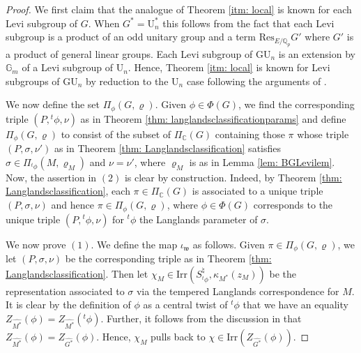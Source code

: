 \documentclass[reqno,11pt]{amsart}
\theoremstyle{remark}
\newcommand{\GU}{\mathrm{GU}}
\newcommand{\U}{\mathrm{U}}
\newcommand{\C}{\mathbb{C}}
\newcommand{\Res}{\mathrm{Res}}
\newcommand{\Irr}{\mathrm{Irr}}
\newcommand{\Gm}{{\mathbb{G}_m}}
\newcommand{\mf}{\mathfrak}
\newcommand{\Q}{\mathbb{Q}}
\begin{document}
\begin{proof}
We first claim that the analogue of Theorem \ref{itm: local} is known for each Levi subgroup of $G$. When $G^*= \U^*_n$ this follows from the fact that each Levi subgroup is a product of an odd unitary group and a term $\Res_{E/\Q_p} G'$ where $G'$ is a product of general linear groups. Each Levi subgroup of $\GU_n$ is an extension by $\Gm$ of a Levi subgroup of $\U_n$. Hence, Theorem \ref{itm: local} is known for Levi subgroups of $\GU_n$ by reduction to the $\U_n$ case following the arguments of \cite[\S2-3]{BMN}.

We now define the set $\Pi_{\phi}(G, \varrho)$. Given $\phi \in \Phi(G)$, we find the corresponding triple $(P, {}^t\phi, \nu)$ as in Theorem \ref{thm: langlandsclassificationparams} and define $\Pi_{\phi}(G, \varrho)$ to consist of the subset of $\Pi_{\C}(G)$ containing those $\pi$ whose triple $(P, \sigma, \nu')$ as in Theorem \ref{thm: Langlandsclassification} satisfies $\sigma \in \Pi_{{}^t\phi}(M, \varrho_M)$ and $\nu=\nu'$, where $\varrho_M$ is as in Lemma \ref{lem: BGLevilem}. Now, the assertion in $(2)$ is clear by construction. Indeed, by Theorem \ref{thm: Langlandsclassification}, each $\pi \in \Pi_{\C}(G)$ is associated to a unique triple $(P, \sigma, \nu)$ and hence $\pi \in \Pi_{\phi}(G, \varrho)$, where $\phi \in \Phi(G)$ corresponds to the unique triple $(P, {}^t\phi, \nu)$ for ${}^t\phi$ the Langlands parameter of $\sigma$.

We now prove $(1)$. We define the map $\iota_{\mf{w}}$ as follows. Given $\pi \in \Pi_{\phi}(G, \varrho)$, we let $(P, \sigma, \nu)$ be the corresponding triple as in Theorem \ref{thm: Langlandsclassification}. Then let $\chi_M \in \Irr(S^{\natural}_{{}^t\phi}, \kappa_{M^*}(z_M))$ be the representation associated to $\sigma$ via the tempered Langlands correspondence for $M$. It is clear by the definition of $\phi$ as a central twist of ${}^t\phi$ that we have an equality $Z_{\widehat{M^*}}(\phi) = Z_{\widehat{M^*}}({}^t\phi)$. Further, it follows from the discussion in \cite[\S 7]{SZ} that $Z_{\widehat{M^*}}(\phi) = Z_{\widehat{G^*}}(\phi)$. Hence, $\chi_M$ pulls back to $\chi \in \Irr(Z_{\widehat{G^*}}(\phi))$.


\end{proof}
\end{document}
